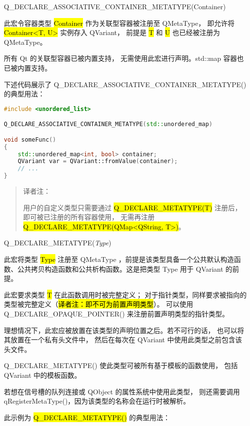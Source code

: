 Q\_DECLARE\_ASSOCIATIVE\_CONTAINER\_METATYPE(Container)

此宏令容器类型 \hl{Container} 作为关联型容器被注册至 QMetaType，
即允许将 \hl{Container<T, U>} 实例存入 QVariant，
前提是 \hl{T} 和 \hl{U} 也已经被注册为 QMetaType。

\begin{warning}
所有 Qt 的关联型容器已被内置支持，
无需使用此宏进行声明。std::map 容器也已被内置支持。
\end{warning}

下述代码展示了 Q\_DECLARE\_ASSOCIATIVE\_CONTAINER\_METATYPE() 的典型用法：

\begin{lstlisting}[language=C++]
#include <unordered_list>

Q_DECLARE_ASSOCIATIVE_CONTAINER_METATYPE(std::unordered_map)

void someFunc()
{
    std::unordered_map<int, bool> container;
    QVariant var = QVariant::fromValue(container);
    // ...
}
\end{lstlisting}

\begin{quote}
译者注：

用户的自定义类型只需要通过 \hl{Q\_DECLARE\_METATYPE(T)} 注册后，
即可被已注册的所有容器使用，
无需再注册 \hl{Q\_DECLARE\_METATYPE(QMap<QString, T>)}。
\end{quote}

Q\_DECLARE\_METATYPE(\emph{Type})

此宏将类型 \hl{Type} 注册至 QMetaType ，前提是该类型具备一个公共默认构造函数、公共拷贝构造函数和公共析构函数。这是把类型 Type 用于 QVariant 的前提。

此宏要求类型 \hl{T} 在此函数调用时被完整定义；
对于指针类型，同样要求被指向的类型被完整定义（\hl{译者注：即不可为前置声明类型}）。
可以使用 Q\_DECLARE\_OPAQUE\_POINTER() 来注册前置声明类型的指针类型。

理想情况下，此宏应被放置在该类型的声明位置之后。若不可行的话，
也可以将其放置在一个私有头文件中，
然后在每次在 QVariant 中使用此类型之前包含该头文件。

Q\_DECLARE\_METATYPE() 使此类型可被所有基于模板的函数使用，
包括 QVariant 中的模板函数。

\begin{notice}
若想在信号槽的队列连接或 QObject 的属性系统中使用此类型，
则还需要调用 qRegisterMetaType()，因为该类型的名称会在运行时被解析。
\end{notice}

此示例为 \hl{Q\_DECLARE\_METATYPE()} 的典型用法：

